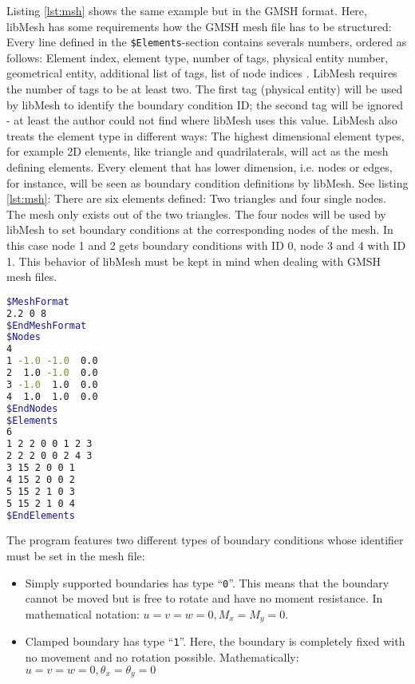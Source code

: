    Listing \ref{lst:msh} shows the same example but in the GMSH format. Here, libMesh has some requirements how the GMSH mesh file has to be structured: Every line defined in the \texttt{\$Elements}-section contains severals numbers, ordered as follows: Element index, element type, number of tags, physical entity number, geometrical entity, additional list of tags, list of node indices \cite{gmsh-manual}. LibMesh requires the number of tags to be at least two. The first tag (physical entity) will be used by libMesh to identify the boundary condition ID; the second tag will be ignored - at least the author could not find where libMesh uses this value. LibMesh also treats the element type in different ways: The highest dimensional element types, for example 2D elements, like triangle and quadrilaterals, will act as the mesh defining elements. Every element that has lower dimension, i.e. nodes or edges, for instance, will be seen as boundary condition definitions by libMesh. See listing \ref{lst:msh}: There are six elements defined: Two triangles and four single nodes. The mesh only exists out of the two triangles. The four nodes will be used by libMesh to set boundary conditions at the corresponding nodes of the mesh. In this case node 1 and 2 gets boundary conditions with ID 0, node 3 and 4 with ID 1. This behavior of libMesh must be kept in mind when dealing with GMSH mesh files.
\begin{lstlisting}[caption=Example GMSH mesh file,label=lst:msh,language=bash,keepspaces=true]
$MeshFormat
2.2 0 8
$EndMeshFormat
$Nodes
4
1 -1.0 -1.0  0.0
2  1.0 -1.0  0.0
3 -1.0  1.0  0.0
4  1.0  1.0  0.0
$EndNodes
$Elements
6
1 2 2 0 0 1 2 3
2 2 2 0 0 2 4 3
3 15 2 0 0 1
4 15 2 0 0 2
5 15 2 1 0 3
5 15 2 1 0 4
$EndElements
\end{lstlisting}

   The program features two different types of boundary conditions whose identifier must be set in the mesh file:
   \begin{itemize}
   	\item Simply supported boundaries has type ``\texttt{0}''. This means that the boundary cannot be moved but is free to rotate and have no moment resistance. In mathematical notation: $u = v = w = 0, M_x = M_y = 0$.
   	\item Clamped boundary has type ``\texttt{1}''. Here, the boundary is completely fixed with no movement and no rotation possible. Mathematically: $u = v = w = 0, \theta_x = \theta_y = 0$
   \end{itemize}
   
